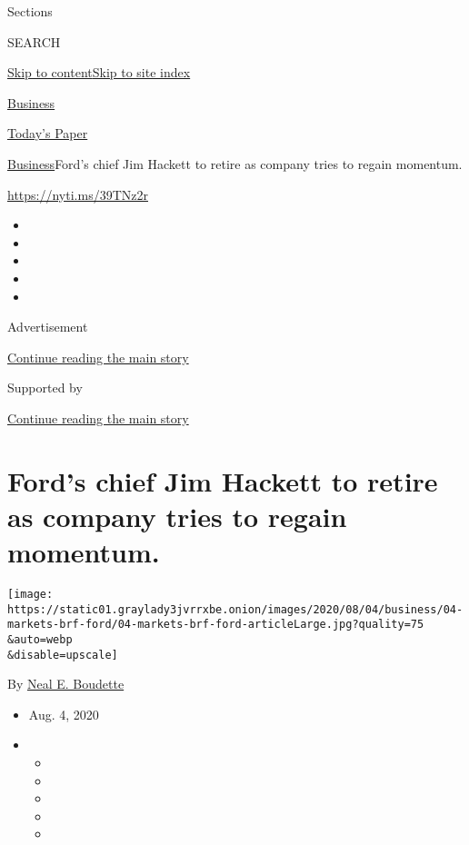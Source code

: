 Sections

SEARCH

\protect\hyperlink{site-content}{Skip to
content}\protect\hyperlink{site-index}{Skip to site index}

\href{https://www.nytimes3xbfgragh.onion/section/business}{Business}

\href{https://myaccount.nytimes3xbfgragh.onion/auth/login?response_type=cookie\&client_id=vi}{}

\href{https://www.nytimes3xbfgragh.onion/section/todayspaper}{Today's
Paper}

\href{/section/business}{Business}\textbar{}Ford's chief Jim Hackett to
retire as company tries to regain momentum.

\url{https://nyti.ms/39TNz2r}

\begin{itemize}
\item
\item
\item
\item
\item
\end{itemize}

Advertisement

\protect\hyperlink{after-top}{Continue reading the main story}

Supported by

\protect\hyperlink{after-sponsor}{Continue reading the main story}

\hypertarget{fords-chief-jim-hackett-to-retire-as-company-tries-to-regain-momentum}{%
\section{Ford's chief Jim Hackett to retire as company tries to regain
momentum.}\label{fords-chief-jim-hackett-to-retire-as-company-tries-to-regain-momentum}}

\texttt{[image: https://static01.graylady3jvrrxbe.onion/images/2020/08/04/business/04-markets-brf-ford/04-markets-brf-ford-articleLarge.jpg?quality=75\\\&auto=webp\\\&disable=upscale]}

By \href{https://www.nytimes3xbfgragh.onion/by/neal-e-boudette}{Neal E.
Boudette}

\begin{itemize}
\item
  Aug. 4, 2020
\item
  \begin{itemize}
  \item
  \item
  \item
  \item
  \item
  \end{itemize}
\end{itemize}

